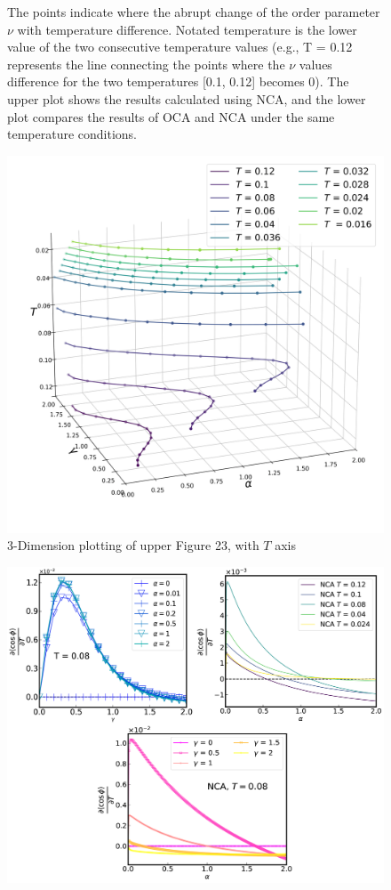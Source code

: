 \documentclass{article}[12pt]
\begin{document}
\begin{spacing}{1.5}
\begin{figure}[H]
  \caption{The points indicate where the abrupt change of the order parameter $\nu$ with temperature difference. 
  Notated temperature is the lower value of the two consecutive temperature values 
  (e.g., T = 0.12 represents the line connecting the points where the $\nu$ values 
  difference for the two temperatures [0.1, 0.12] becomes 0). The upper plot shows the results calculated using NCA, 
  and the lower plot compares the results of OCA and NCA under the same temperature conditions.}
   \label{2Dplot}
\end{figure}
\begin{figure}[H]
  \centerline{\includegraphics[width=17cm]{TexFigure/4_3_10_3dplot_Ns3_proj_20-1.png}}
  \caption{3-Dimension plotting of upper Figure 23, with $T$ axis}%
\end{figure}
\pagebreak
\begin{figure}[H]
  \vfill
  \centering
  \centerline{\includegraphics[width=15cm]{TexFigure/4_3_11_1D_follow.png}}

\end{figure}
\end{spacing}
\end{document}
